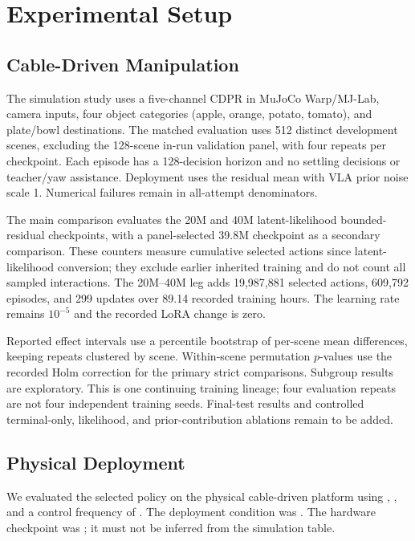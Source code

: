 \section{Experimental Setup}\label{sec:setup}
\subsection{Cable-Driven Manipulation}
The simulation study uses a five-channel CDPR in MuJoCo Warp/MJ-Lab, camera inputs, four object categories (apple, orange, potato, tomato), and plate/bowl destinations. The matched evaluation uses 512 distinct development scenes, excluding the 128-scene in-run validation panel, with four repeats per checkpoint. Each episode has a 128-decision horizon and no settling decisions or teacher/yaw assistance. Deployment uses the residual mean with VLA prior noise scale 1. Numerical failures remain in all-attempt denominators. 

The main comparison evaluates the 20M and 40M latent-likelihood bounded-residual checkpoints, with a panel-selected 39.8M checkpoint as a secondary comparison. These counters measure cumulative selected actions since latent-likelihood conversion; they exclude earlier inherited training and do not count all sampled interactions. The 20M--40M leg adds 19,987,881 selected actions, 609,792 episodes, and 299 updates over 89.14 recorded training hours. The learning rate remains $10^{-5}$ and the recorded LoRA change is zero.

Reported effect intervals use a percentile bootstrap of per-scene mean differences, keeping repeats clustered by scene. Within-scene permutation $p$-values use the recorded Holm correction for the primary strict comparisons. Subgroup results are exploratory. This is one continuing training lineage; four evaluation repeats are not four independent training seeds. Final-test results and controlled terminal-only, likelihood, and prior-contribution ablations remain to be added.


\subsection{Physical Deployment}
We evaluated the selected policy on the physical cable-driven platform using , , and a control frequency of . The deployment condition was . The hardware checkpoint was ; it must not be inferred from the simulation table.

